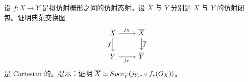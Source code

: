 \begin{exercise}\label{exc:20.6.9}
设 $f:X\to Y$ 是拟仿射概形之间的仿射态射。设 $\overline{X}$ 与 $\overline{Y}$ 分别是 $X$ 与 $Y$ 的仿射闭包。证明典范交换图
\[
\begin{tikzcd}
X \arrow[r,"j_X"] \arrow[d,"f"'] & \overline{X} \arrow[d,"\overline{f}"] \\
Y \arrow[r,"j_Y"'] & \overline{Y}
\end{tikzcd}
\]
是 Cartesian 的。提示：证明 $\overline{X}\simeq Spec_{\overline{Y}}(j_{Y,*}\circ f_*(O_X))$。
\end{exercise}
